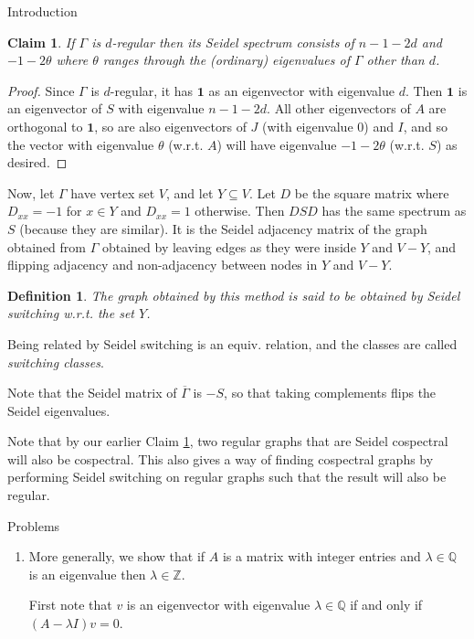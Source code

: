 \documentclass{article}
\newcommand{\Q}{\mathbb Q}
\newcommand{\Z}{\mathbb Z}
\newtheorem{claim}{Claim}
\newtheorem{defn}{Definition}
\begin{document}
\begin{section}{Introduction}
  \begin{claim}\label{regular-seidel}
    If $\Gamma$ is $d$-regular then its Seidel spectrum consists of $n-1-2d$ and $-1-2\theta$ where $\theta$ ranges through the (ordinary) eigenvalues of $\Gamma$ other than $d$.
  \end{claim}
  \begin{proof}
    Since $\Gamma$ is $d$-regular, it has $\mathbf 1$ as an eigenvector with eigenvalue $d$.
    Then $\mathbf 1$ is an eigenvector of $S$ with eigenvalue $n-1-2d$.
    All other eigenvectors of $A$ are orthogonal to $\mathbf 1$, so are also eigenvectors of $J$ (with eigenvalue 0) and $I$, and so the vector with eigenvalue $\theta$ (w.r.t. $A$) will have eigenvalue $-1-2\theta$ (w.r.t. $S$) as desired.
  \end{proof}

  Now, let $\Gamma$ have vertex set $V$, and let $Y \subseteq V$.
  Let $D$ be the square matrix where $D_{xx} = -1$ for $x \in Y$ and $D_{xx} = 1$ otherwise.
  Then $DSD$ has the same spectrum as $S$ (because they are similar).
  It is the Seidel adjacency matrix of the graph obtained from $\Gamma$ obtained by leaving edges as they were inside $Y$ and $V - Y$, and flipping adjacency and non-adjacency between nodes in $Y$ and $V - Y$.
  \begin{defn}
    The graph obtained by this method is said to be obtained by \emph{Seidel switching} w.r.t. the set $Y$.
  \end{defn}
  Being related by Seidel switching is an equiv. relation, and the classes are called \emph{switching classes}.

  Note that the Seidel matrix of $\overline \Gamma$ is $-S$, so that taking complements flips the Seidel eigenvalues.

  Note that by our earlier Claim \ref{regular-seidel}, two regular graphs that are Seidel cospectral will also be cospectral.
  This also gives a way of finding cospectral graphs by performing Seidel switching on regular graphs such that the result will also be regular.


  Problems
  \begin{enumerate}
    \item
      More generally, we show that if $A$ is a matrix with integer entries and $\lambda \in \Q$ is an eigenvalue then $\lambda \in \Z$.

      First note that $v$ is an eigenvector with eigenvalue $\lambda \in \Q$ if and only if $(A-\lambda I)v = 0$.


\end{enumerate}
\end{section}
\end{document}
